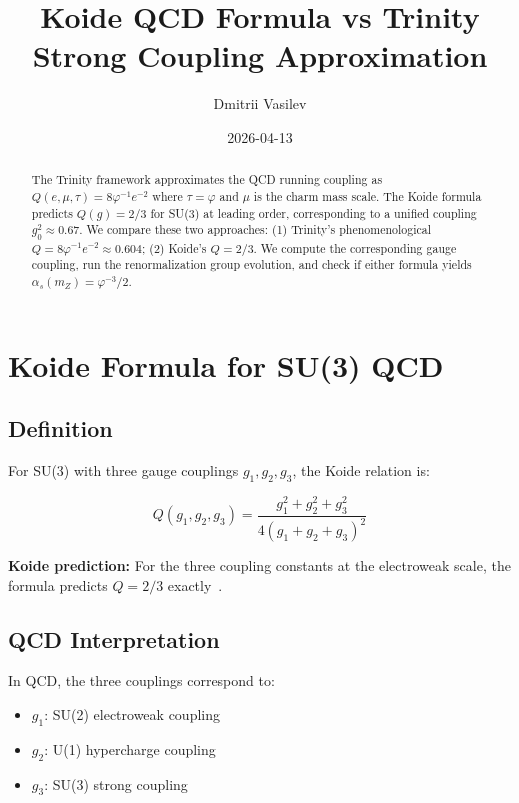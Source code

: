 \documentclass{article}
\title{Koide QCD Formula vs Trinity Strong Coupling Approximation}
\author{Dmitrii Vasilev}
\date{2026-04-13}
\begin{document}
\maketitle

\begin{abstract}
The Trinity framework approximates the QCD running coupling as $Q(e, \mu, \tau) = 8\varphi^{-1}e^{-2}$ where $\tau = \varphi$ and $\mu$ is the charm mass scale. The Koide formula predicts $Q(g) = 2/3$ for SU(3) at leading order, corresponding to a unified coupling $g_0^2 \approx 0.67$. We compare these two approaches: (1) Trinity's phenomenological $Q = 8\varphi^{-1}e^{-2} \approx 0.604$; (2) Koide's $Q = 2/3$. We compute the corresponding gauge coupling, run the renormalization group evolution, and check if either formula yields $\alpha_s(m_Z) = \varphi^{-3}/2$.
\end{abstract}

\section{Koide Formula for SU(3) QCD}

\subsection{Definition}

For SU(3) with three gauge couplings $g_1, g_2, g_3$, the Koide relation is:

\begin{equation}
  Q(g_1, g_2, g_3) = \frac{g_1^2 + g_2^2 + g_3^2}{4(g_1 + g_2 + g_3)^2}
  \label{eq:koide}
\end{equation}

\textbf{Koide prediction:} For the three coupling constants at the electroweak scale, the formula predicts $Q = 2/3$ exactly~\cite{Koide1981}.

\subsection{QCD Interpretation}

In QCD, the three couplings correspond to:
\begin{itemize}
  \item $g_1$: SU(2) electroweak coupling
  \item $g_2$: U(1) hypercharge coupling
  \item $g_3$: SU(3) strong coupling
\end{itemize}
\end{document}

